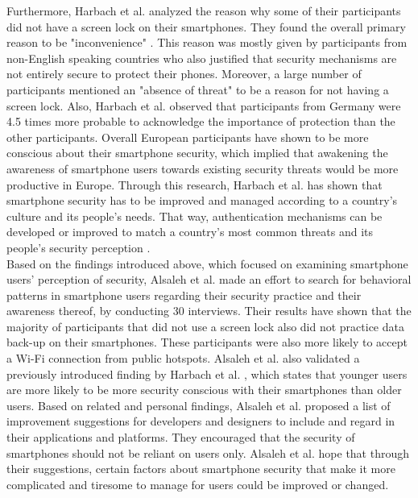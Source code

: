 Furthermore, Harbach et al. \cite{Harbach:2016} analyzed the reason why some of their participants did not have a screen lock on their smartphones. They found the overall primary reason to be "inconvenience" \cite{Harbach:2016}. This reason was mostly given by participants from non-English speaking countries who also justified that security mechanisms are not entirely secure to protect their phones. Moreover, a large number of participants mentioned an "absence of threat" \cite{Harbach:2016} to be a reason for not having a screen lock. Also, Harbach et al. \cite{Harbach:2016} observed that participants from Germany were 4.5 times more probable to acknowledge the importance of protection than the other participants. Overall European participants have shown to be more conscious about their smartphone security, which implied that awakening the awareness of smartphone users towards existing security threats would be more productive in Europe. Through this research, Harbach et al. \cite{Harbach:2016} has shown that smartphone security has to be improved and managed according to a country's culture and its people's needs. That way, authentication mechanisms can be developed or improved to match a country's most common threats and its people's security perception \cite{Harbach:2016}. \\ 

Based on the findings introduced above, which focused on examining smartphone users' perception of security, Alsaleh et al. \cite{Alsaleh} made an effort to search for behavioral patterns in smartphone users regarding their security practice and their awareness thereof, by conducting 30 interviews. Their results have shown that the majority of participants that did not use a screen lock also did not practice data back-up on their smartphones. These participants were also more likely to accept a Wi-Fi connection from public hotspots. Alsaleh et al. \cite{Alsaleh} also validated a previously introduced finding by Harbach et al. \cite{Harbach:2016}, which states that younger users are more likely to be more security conscious with their smartphones than older users. Based on related and personal findings, Alsaleh et al. \cite{Alsaleh} proposed a list of improvement suggestions for developers and designers to include and regard in their applications and platforms. They encouraged that the security of smartphones should not be reliant on users only. Alsaleh et al. \cite{Alsaleh} hope that through their suggestions, certain factors about smartphone security that make it more complicated and tiresome to manage for users could be improved or changed.\\

